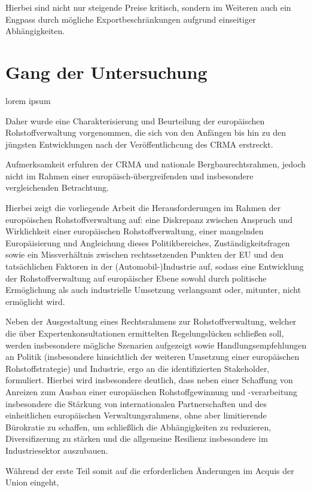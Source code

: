 \documentclass[12pt,a4paper,oneside]{book} %
\begin{document}
Hierbei sind nicht nur steigende Preise kritisch, sondern im Weiteren auch ein Engpass durch mögliche Exportbeschränkungen aufgrund einseitiger Abhängigkeiten.

\section{Gang der Untersuchung}
lorem ipsum

Daher wurde eine Charakterisierung und Beurteilung der europäischen Rohstoffverwaltung vorgenommen, die sich von den Anfängen bis hin zu den jüngsten Entwicklungen nach der Veröffentlichcung des CRMA erstreckt. 

Aufmerksamkeit erfuhren der CRMA und nationale Bergbaurechtsrahmen, jedoch nicht im Rahmen einer europäisch-übergreifenden und insbesondere vergleichenden Betrachtung.

Hierbei zeigt die vorliegende Arbeit die Herausforderungen im Rahmen der europöischen Rohstoffverwaltung auf: eine Diskrepanz zwischen Anspruch und Wirklichkeit einer europäischen Rohstoffverwaltung, einer mangelnden Europäisierung und Angleichung dieses Politikbereiches, Zuständigkeitsfragen sowie ein Missverhältnis zwischen rechtssetzenden Punkten der EU und den tatsächlichen Faktoren in der (Automobil-)Industrie auf, sodass eine Entwicklung der Rohstoffverwaltung auf europäischer Ebene sowohl durch politische Ermöglichung als auch industrielle Umsetzung verlangsamt oder, mitunter, nicht ermöglicht wird.

Neben der Ausgestaltung eines Rechtsrahmens zur Rohstoffverwaltung, welcher die über Expertenkonsultationen ermittelten Regelungslücken schließen soll, werden insbesondere mögliche Szenarien aufgezeigt sowie Handlungsempfehlungen an Politik (insbesondere hinsichtlich der weiteren Umsetzung einer europäischen Rohstoffstrategie) und Industrie, ergo an die identifizierten Stakeholder, formuliert. Hierbei wird insbesondere deutlich, dass neben einer Schaffung von Anreizen zum Ausbau einer europäischen Rohstoffgewinnung und -verarbeitung insbesondere die Stärkung von internationalen Partnerschaften und des einheitlichen europäischen Verwaltungsrahmens, ohne aber limitierende Bürokratie zu schaffen, um schließlich die Abhängigkeiten zu reduzieren, Diversifizerung zu stärken und die allgemeine Resilienz insbesondere im Industriesektor auszubauen.

Während der erste Teil somit auf die erforderlichen Änderungen im Acquis der Union eingeht, 
\end{document}
